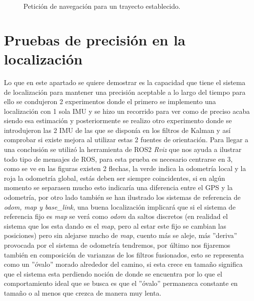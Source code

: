 \begin{figure}[htbp]
\begin{minipage}[b]{0.45\textwidth}
    \caption{Petición de navegación para un trayecto establecido.}
    \label{fig:peticion_camino}
  \end{minipage}
\end{figure}

\newpage

\section{Pruebas de precisión en la localización}

Lo que en este apartado se quiere demostrar es la capacidad que tiene el sistema de localización para mantener una precisión aceptable a lo 
largo del tiempo para ello se condujeron 2 experimentos donde el primero se implemento una localización con 1 sola IMU y se hizo un recorrido para ver como de preciso acaba siendo esa estimación 
y posteriormente se realizo otro experimento donde se introdujeron las 2 IMU de las que se disponía en los filtros de Kalman y así comprobar si existe mejora al 
utilizar estas 2 fuentes de orientación. Para llegar a una conclusión se utilizó la herramienta de ROS2 \textit{Rviz} que nos ayuda a 
ilustrar todo tipo de mensajes de ROS, para esta prueba es necesario centrarse en 3, como se ve en las figuras existen 2 flechas, la verde indica la odometría local y la roja la odometría global, estás deben ser siempre 
coincidentes, si en algún momento se separasen mucho esto indicaría una diferencia entre el GPS y la odometría, por otro lado también se han 
ilustrado los sistemas de referencia de \textit{odom, map y base\_link}, una buena localización implicará que si el sistema de referencia fijo es \textit{map} 
se verá como \textit{odom} da saltos discretos (en realidad el sistema que los esta dando es el \textit{map}, pero al estar este fijo se cambian las posiciones) pero 
sin alejarse mucho de \textit{map}, cuento más se aleje, más ''deriva'' provocada por el sistema de odometría tendremos, por último nos fijaremos también en 
composición de varianzas de los filtros fusionados, esto se representa como un ''óvalo'' morado alrededor del camino, si esta crece en tamaño significa que el sistema 
esta perdiendo noción de donde se encuentra por lo que el comportamiento ideal que se busca es que el ''óvalo'' permanezca constante en tamaño o al menos que 
crezca de manera muy lenta.


